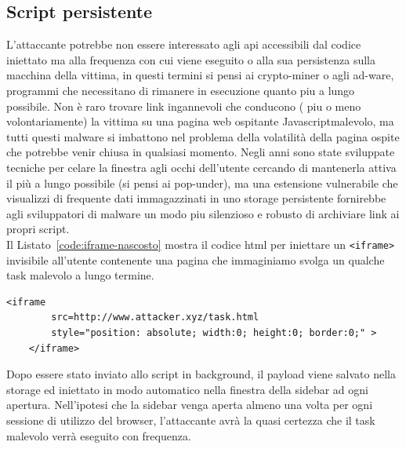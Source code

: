 \documentclass{sapthesis}
\newcommand{\code}[1]{\texttt{#1}}
\newcommand{\refCode}[1]{Listato~\ref{#1}}
\newcommand{\JS}{Javascript}
\newcommand{\tagHTML}[1]{\code{<#1>}}
\newcommand{\iframe}{\tagHTML{iframe}}
\begin{document}
        \subsection{Script persistente}
            L'attaccante potrebbe non essere interessato agli api accessibili dal codice iniettato ma
            alla frequenza con cui viene eseguito o alla sua persistenza sulla macchina della vittima, 
            in questi termini si pensi ai crypto-miner o agli ad-ware, programmi che necessitano di 
            rimanere in esecuzione quanto piu a lungo possibile.
            Non è raro trovare link ingannevoli che conducono ( piu o meno
            volontariamente) la vittima su una pagina web ospitante \JS malevolo, ma tutti questi malware
            si imbattono nel problema della volatilità della pagina ospite che potrebbe venir chiusa in
            qualsiasi momento. Negli anni sono state sviluppate tecniche per celare la finestra agli occhi
            dell'utente cercando di mantenerla attiva il più a lungo possibile (si pensi ai pop-under), ma
            una estensione vulnerabile che visualizzi di frequente dati immagazzinati in uno storage 
            persistente fornirebbe agli sviluppatori di malware un modo piu silenzioso e robusto di
            archiviare link ai propri script.\\
            Il \refCode{code:iframe-nascosto} mostra il codice html per iniettare un \iframe{} invisibile
            all'utente contenente una pagina che immaginiamo svolga un qualche task malevolo a lungo termine.

            \begin{lstlisting}[label=code:iframe-nascosto]
    <iframe 
        src=http://www.attacker.xyz/task.html 
        style="position: absolute; width:0; height:0; border:0;" >
    </iframe>
\end{lstlisting}

            Dopo essere stato inviato allo script in background, il payload viene salvato nella storage ed
            iniettato in modo automatico nella finestra della sidebar ad ogni apertura. Nell'ipotesi che
            la sidebar venga aperta almeno una volta per ogni sessione di utilizzo del browser, l'attaccante
            avrà la quasi certezza che il task malevolo verrà eseguito con frequenza.
\end{document}
